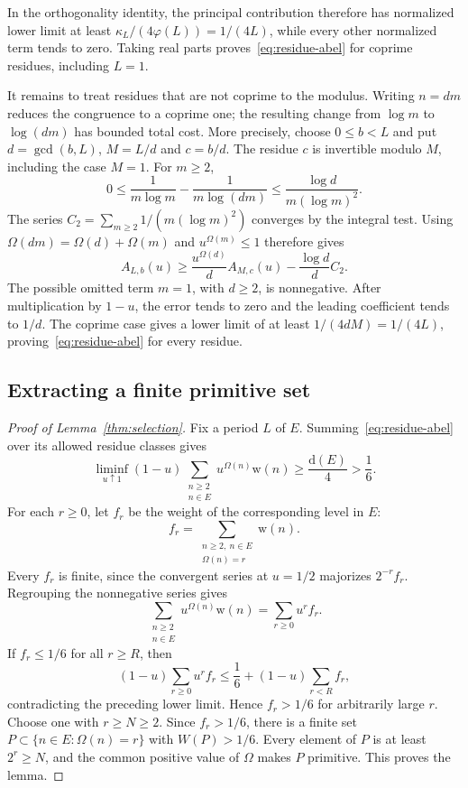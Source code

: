 \documentclass[11pt,reqno]{amsart}
\theoremstyle{definition}
\theoremstyle{remark}
\numberwithin{equation}{section}
\newcommand{\Om}{\Omega}
\newcommand{\wt}{\mathrm w}
\newcommand{\dens}{\mathrm d}
\begin{document}
In the orthogonality identity, the principal contribution therefore
has normalized lower limit at least
$\kappa_L/(4\varphi(L))=1/(4L)$, while every other normalized term
tends to zero. Taking real parts proves~\eqref{eq:residue-abel}
for coprime residues, including $L=1$.

It remains to treat residues that are not coprime to the modulus.
Writing $n=dm$ reduces the congruence to a coprime one; the resulting
change from $\log m$ to $\log(dm)$ has bounded total cost.
More precisely, choose $0\leq b<L$ and put
$d=\gcd(b,L)$, $M=L/d$ and $c=b/d$. The residue $c$ is invertible
modulo $M$, including the case $M=1$. For $m\geq2$,
\[
 0\leq\frac1{m\log m}-\frac1{m\log(dm)}
       \leq\frac{\log d}{m(\log m)^2}.
\]
The series $C_2=\sum_{m\geq2}1/(m(\log m)^2)$ converges by the
integral test. Using $\Om(dm)=\Om(d)+\Om(m)$ and $u^{\Om(m)}\leq1$
therefore gives
\[
 A_{L,b}(u)\geq\frac{u^{\Om(d)}}d A_{M,c}(u)
                        -\frac{\log d}{d}C_2.
\]
The possible omitted term $m=1$, with $d\geq2$, is nonnegative.
After multiplication by $1-u$, the error tends to zero and the leading
coefficient tends to $1/d$. The coprime case gives a lower limit of at
least $1/(4dM)=1/(4L)$, proving~\eqref{eq:residue-abel} for every residue.

\subsection{Extracting a finite primitive set}
\begin{proof}[Proof of Lemma~\ref{thm:selection}]
Fix a period $L$ of $E$. Summing~\eqref{eq:residue-abel} over its
allowed residue classes gives
\[
 \liminf_{u\uparrow1}(1-u)
       \sum_{\substack{n\geq2\\n\in E}}u^{\Om(n)}\wt(n)
       \geq\frac{\dens(E)}4>\frac16.
\]
For each $r\geq0$, let $f_r$ be the weight of the corresponding level in $E$:
\[
 f_r=\sum_{\substack{n\geq2,\ n\in E\\\Om(n)=r}}\wt(n).
\]
Every $f_r$ is finite, since the convergent series at $u=1/2$
majorizes $2^{-r}f_r$. Regrouping the nonnegative series gives
\[
 \sum_{\substack{n\geq2\\n\in E}}u^{\Om(n)}\wt(n)
       =\sum_{r\geq0}u^rf_r.
\]
If $f_r\leq1/6$ for all $r\geq R$, then
\[
 (1-u)\sum_{r\geq0}u^rf_r
       \leq\frac16+(1-u)\sum_{r<R}f_r,
\]
contradicting the preceding lower limit. Hence $f_r>1/6$ for
arbitrarily large $r$. Choose one with $r\geq N\geq2$.
Since $f_r>1/6$, there is a finite set
$P\subset\{n\in E:\Om(n)=r\}$ with $W(P)>1/6$.
Every element of $P$ is at least $2^r\geq N$, and the common positive
value of $\Om$ makes $P$ primitive. This proves the lemma.
\end{proof}
\end{document}
